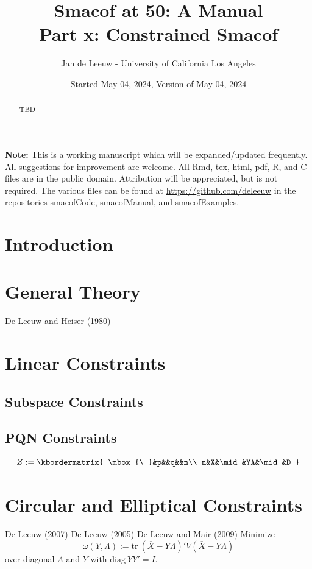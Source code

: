 \documentclass[
  12pt,
]{article}
\title{Smacof at 50: A Manual\\
Part x: Constrained Smacof}
\author{Jan de Leeuw - University of California Los Angeles}
\date{Started May 04, 2024, Version of May 04, 2024}
\begin{document}
\maketitle
\begin{abstract}
TBD
\end{abstract}

{
\setcounter{tocdepth}{3}
\tableofcontents
}
\textbf{Note:} This is a working manuscript which will be expanded/updated
frequently. All suggestions for improvement are welcome. All Rmd, tex,
html, pdf, R, and C files are in the public domain. Attribution will be
appreciated, but is not required. The various files can be found at
\url{https://github.com/deleeuw} in the repositories smacofCode, smacofManual,
and smacofExamples.

\section{Introduction}\label{introduction}

\section{General Theory}\label{general-theory}

De Leeuw and Heiser (1980)

\section{Linear Constraints}\label{linear-constraints}

\subsection{Subspace Constraints}\label{subspace-constraints}

\subsection{PQN Constraints}\label{pqn-constraints}

\[
Z:=\kbordermatrix{
\mbox{\ }&p&&q&&n\\
n&X&\mid&YA&\mid&D
}
\]

\section{Circular and Elliptical Constraints}\label{circular-and-elliptical-constraints}

De Leeuw (2007)
De Leeuw (2005)
De Leeuw and Mair (2009)
Minimize
\[
\omega(Y,\Lambda):=\text{tr}\ (\overline{X}-Y\Lambda)'V(\overline{X}-Y\Lambda)
\]
over diagonal \(\Lambda\) and \(Y\) with \(\text{diag}\ YY'=I\).
\end{document}
